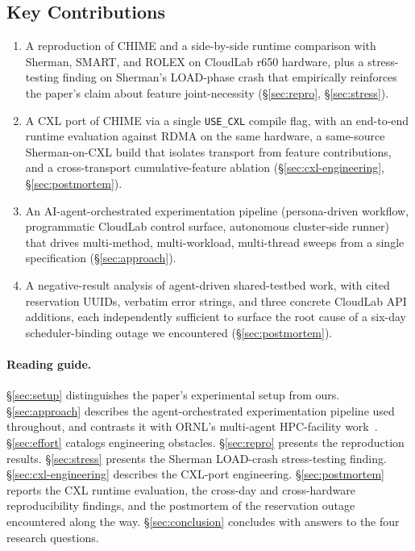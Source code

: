 \documentclass[11pt,a4paper]{article}
\begin{document}
\subsection{Key Contributions}

\begin{enumerate}[nosep,leftmargin=*]
    \item A reproduction of CHIME and a side-by-side runtime comparison with Sherman, SMART, and ROLEX on CloudLab r650 hardware, plus a stress-testing finding on Sherman's LOAD-phase crash that empirically reinforces the paper's claim about feature joint-necessity (\S\ref{sec:repro}, \S\ref{sec:stress}).
    \item A CXL port of CHIME via a single \texttt{USE\_CXL} compile flag, with an end-to-end runtime evaluation against RDMA on the same hardware, a same-source Sherman-on-CXL build that isolates transport from feature contributions, and a cross-transport cumulative-feature ablation (\S\ref{sec:cxl-engineering}, \S\ref{sec:postmortem}).
    \item An AI-agent-orchestrated experimentation pipeline (persona-driven workflow, programmatic CloudLab control surface, autonomous cluster-side runner) that drives multi-method, multi-workload, multi-thread sweeps from a single specification (\S\ref{sec:approach}).
    \item A negative-result analysis of agent-driven shared-testbed work, with cited reservation UUIDs, verbatim error strings, and three concrete CloudLab API additions, each independently sufficient to surface the root cause of a six-day scheduler-binding outage we encountered (\S\ref{sec:postmortem}).
\end{enumerate}

\paragraph{Reading guide.} §\ref{sec:setup} distinguishes the paper's experimental setup from ours. §\ref{sec:approach} describes the agent-orchestrated experimentation pipeline used throughout, and contrasts it with ORNL's multi-agent HPC-facility work~\cite{ornl-agents-xloop25}. §\ref{sec:effort} catalogs engineering obstacles. §\ref{sec:repro} presents the reproduction results. §\ref{sec:stress} presents the Sherman LOAD-crash stress-testing finding. §\ref{sec:cxl-engineering} describes the CXL-port engineering. §\ref{sec:postmortem} reports the CXL runtime evaluation, the cross-day and cross-hardware reproducibility findings, and the postmortem of the reservation outage encountered along the way. §\ref{sec:conclusion} concludes with answers to the four research questions.
\end{document}
